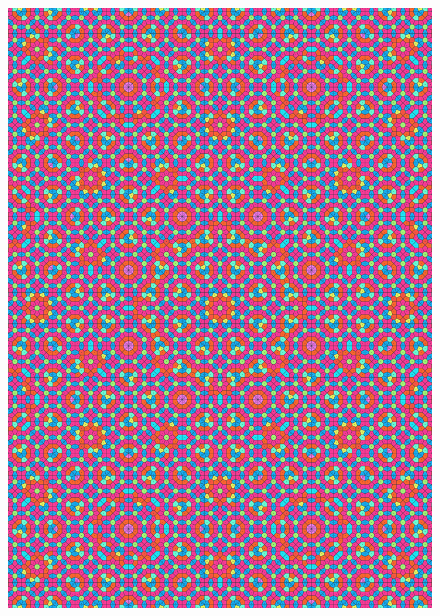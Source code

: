 \documentclass[text.tex]{subfiles}
\begin{document}
\begin{figure}[h!]
\centering
\includegraphics[width=1\textwidth]{img/results/circle8/quasi_circle_135281_(-287_120alpha_2).pdf}
\end{figure}
\end{document}
